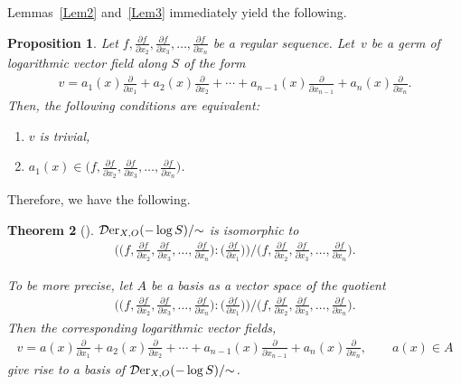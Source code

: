 \documentclass[pdftex]{sigma}%
\numberwithin{equation}{section}
\newtheorem{Theorem}{Theorem}[section]
\newtheorem{Proposition}[Theorem]{Proposition}
 { \theoremstyle{definition}
\newtheorem{Definition}[Theorem]{Definition}
\newtheorem{Remark}[Theorem]{Remark}
\newtheorem{Example}[Theorem]{Example}
 }
\begin{document}
Lemmas~\ref{Lem2} and~\ref{Lem3} immediately yield the following.

\begin{Proposition}
Let $f, \frac{\partial f}{\partial x_2}, \frac{\partial f}{\partial x_3}, \ldots,
\frac{\partial f}{\partial x_{n}} $ be a regular sequence. Let~$v$ be a germ of logarithmic
vector field along $S$ of the form
\begin{gather*}
v= {a_1(x)\frac{\partial }{\partial x_1} + a_2(x)\frac{\partial}{\partial x_2} + \cdots +
 a_{n-1}(x)\frac{\partial}{\partial x_{n-1}}+ a_n(x)\frac{\partial}{\partial x_n}}.
\end{gather*}
 Then, the following conditions are equivalent:
\begin{enumerate}\itemsep=0pt
\item[$(i)$] $v$ is trivial,

\item[$(ii)$] $a_1(x) \in \big(f, \frac{\partial f}{\partial x_2}, \frac{\partial f}{\partial x_3},\ldots,\frac{\partial f}{\partial x_{n}}\big)$.
\end{enumerate}
\end{Proposition}

Therefore, we have the following.

\begin{Theorem}[\cite{T}]
$ {\mathcal D}{\rm er}_{X, O}(-\log S)/{\sim} $ is isomorphic to
\begin{gather*}
\bigg(\bigg(f, \frac{\partial f}{\partial x_2}, \frac{\partial f}{\partial x_3},\ldots,\frac{\partial f}{\partial x_{n}}\bigg) : \bigg(\frac{\partial f}{\partial x_1}\bigg)\bigg)\Big/\bigg(f, \frac{\partial f}{\partial x_2}, \frac{\partial f}{\partial x_3},\ldots,\frac{\partial f}{\partial x_{n}}\bigg).
\end{gather*}

To be more precise, let $A$ be a basis as a vector space of the quotient
\begin{gather*}
\bigg(\bigg(f, \frac{\partial f}{\partial x_2}, \frac{\partial f}{\partial x_3},\ldots,\frac{\partial f}{\partial x_{n}}\bigg) : \bigg(\frac{\partial f}{\partial x_1}\bigg)\bigg)\Big/\bigg(f, \frac{\partial f}{\partial x_2}, \frac{\partial f}{\partial x_3},\ldots,\frac{\partial f}{\partial x_{n}}\bigg).
\end{gather*}
Then the corresponding logarithmic vector fields,
\begin{gather*}
v= a(x)\frac{\partial }{\partial x_1} + a_2(x)\frac{\partial}{\partial x_2} + \cdots +a_{n-1}(x)\frac{\partial}{\partial x_{n-1}}+ a_n(x)\frac{\partial}{\partial x_n}, \qquad
a(x) \in A
\end{gather*}
give rise to a basis of $ {\mathcal D}{\rm er}_{X, O}(-\log S)/{\sim}$.

\end{Theorem}
\end{document}
